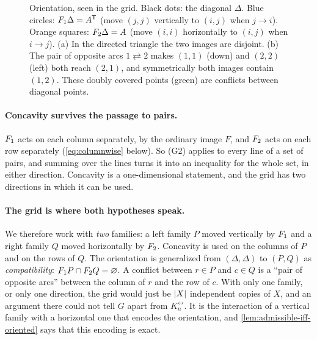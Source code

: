 \begin{figure}[ht]
\caption{Orientation, seen in the grid. Black dots: the diagonal $\Delta$.
Blue circles: $F_1\Delta=A^{\mathsf T}$ (move $(j,j)$ vertically to $(i,j)$ when
$j\to i$). Orange squares: $F_2\Delta=A$ (move $(i,i)$ horizontally to
$(i,j)$ when $i\to j$). (a) In the directed triangle the two images are
disjoint. (b) The pair of opposite arcs $1\rightleftarrows2$ makes
$(1,1)$ (down) and $(2,2)$ (left) both reach $(2,1)$, and symmetrically
both images contain $(1,2)$. These doubly covered points (green) are
conflicts between diagonal points.}
\label{fig:story}
\end{figure}

\paragraph{Concavity survives the passage to pairs.}
$F_1$ acts on each column separately, by the ordinary image $F$, and $F_2$
acts on each row separately (\eqref{eq:columnwise} below). So (G2) applies to
every line of a set of pairs, and summing over the lines turns it into an
inequality for the whole set, in either direction. Concavity is a
one-dimensional statement, and the grid has two directions in which it can
be used.

\paragraph{The grid is where both hypotheses speak.}
We therefore work with \emph{two} families: a left family $P$ moved
vertically by $F_1$ and a right family $Q$ moved horizontally by $F_2$.
Concavity is used on the columns of $P$ and on the rows of $Q$. The
orientation is generalized from $(\Delta,\Delta)$ to $(P,Q)$ as
\emph{compatibility}: $F_1 P\cap F_2 Q=\varnothing$. A conflict between
$r\in P$ and $c\in Q$ is a ``pair of opposite arcs'' between the column of
$r$ and the row of $c$. With only one family, or only one direction, the grid
would just be $\lvert X\rvert$ independent copies of $X$, and an argument there
could not tell $G$ apart from $K_n^{\leftrightarrow}$. It is the interaction
of a vertical family with a horizontal one that encodes the orientation,
and \cref{lem:admissible-iff-oriented} says that this encoding is exact.

